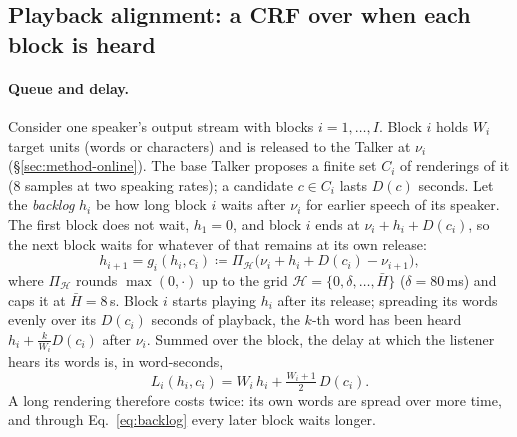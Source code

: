 \subsection{Playback alignment: a CRF over when each block is heard}
\label{sec:method-plem}

\paragraph{Queue and delay.} Consider one speaker's output stream with blocks $i=1,\dots,I$. Block $i$ holds $W_i$
target units (words or characters) and is released to the Talker at $\nu_i$ (\S\ref{sec:method-online}). The base
Talker proposes a finite set $C_i$ of renderings of it (8 samples at two speaking rates); a candidate $c\in C_i$ lasts
$D(c)$ seconds. Let the \emph{backlog} $h_i$ be how long block $i$ waits after $\nu_i$ for earlier speech of its
speaker. The first block does not wait, $h_1=0$, and block $i$ ends at $\nu_i+h_i+D(c_i)$, so the next block waits for
whatever of that remains at its own release:
\begin{equation}
h_{i+1}=g_i(h_i,c_i)\coloneqq\Pi_{\mathcal{H}}\big(\nu_i+h_i+D(c_i)-\nu_{i+1}\big),\!
\label{eq:backlog}
\end{equation}
where $\Pi_{\mathcal{H}}$ rounds $\max(0,\cdot)$ up to the grid $\mathcal{H}=\{0,\delta,\dots,\bar{H}\}$ ($\delta=80$\,ms)
and caps it at $\bar{H}=8$\,s. Block $i$ starts playing $h_i$ after its release; spreading its words evenly over its
$D(c_i)$ seconds of playback, the $k$-th word has been heard $h_i+\frac{k}{W_i}D(c_i)$ after $\nu_i$. Summed over the block,
the delay at which the listener hears its words is, in word-seconds,
\begin{equation}
L_i(h_i,c_i)=W_i\,h_i+\tfrac{W_i+1}{2}\,D(c_i).
\label{eq:lat}
\end{equation}
A long rendering therefore costs twice: its own words are spread over more time, and through Eq.~\eqref{eq:backlog}
every later block waits longer.


